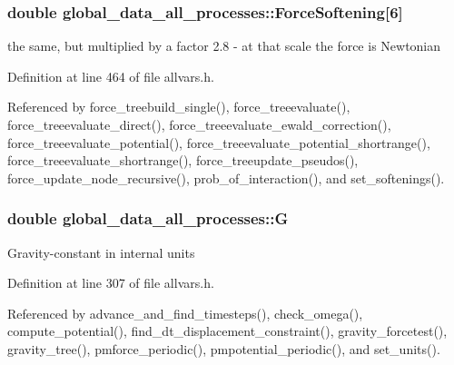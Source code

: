 \hypertarget{structglobal__data__all__processes_a2f875884085b35ff64047e46f5348be4}{
\subsubsection[{ForceSoftening}]{\setlength{\rightskip}{0pt plus 5cm}double {\bf global\_\-data\_\-all\_\-processes::ForceSoftening}\mbox{[}6\mbox{]}}}
\label{structglobal__data__all__processes_a2f875884085b35ff64047e46f5348be4}
the same, but multiplied by a factor 2.8 -\/ at that scale the force is Newtonian 

Definition at line 464 of file allvars.h.



Referenced by force\_\-treebuild\_\-single(), force\_\-treeevaluate(), force\_\-treeevaluate\_\-direct(), force\_\-treeevaluate\_\-ewald\_\-correction(), force\_\-treeevaluate\_\-potential(), force\_\-treeevaluate\_\-potential\_\-shortrange(), force\_\-treeevaluate\_\-shortrange(), force\_\-treeupdate\_\-pseudos(), force\_\-update\_\-node\_\-recursive(), prob\_\-of\_\-interaction(), and set\_\-softenings().

\hypertarget{structglobal__data__all__processes_a1250b5c6e116b576ff09cbcd928d2063}{
\subsubsection[{G}]{\setlength{\rightskip}{0pt plus 5cm}double {\bf global\_\-data\_\-all\_\-processes::G}}}
\label{structglobal__data__all__processes_a1250b5c6e116b576ff09cbcd928d2063}
Gravity-\/constant in internal units 

Definition at line 307 of file allvars.h.



Referenced by advance\_\-and\_\-find\_\-timesteps(), check\_\-omega(), compute\_\-potential(), find\_\-dt\_\-displacement\_\-constraint(), gravity\_\-forcetest(), gravity\_\-tree(), pmforce\_\-periodic(), pmpotential\_\-periodic(), and set\_\-units().

